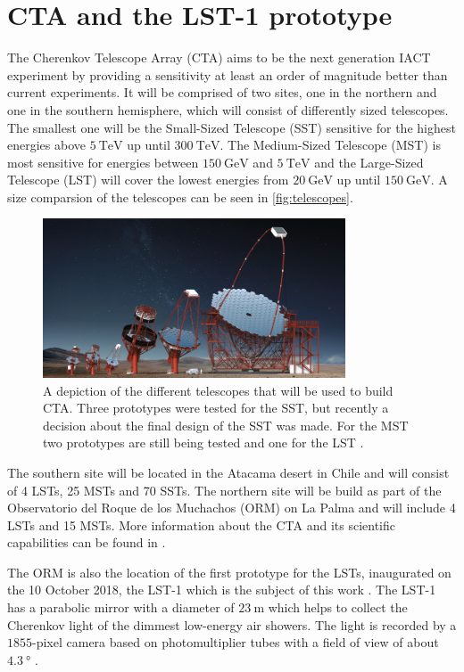 \section{CTA and the LST-1 prototype}
The Cherenkov Telescope Array (CTA) aims to be the next generation IACT experiment by providing a sensitivity at least an order of magnitude better than current experiments.
It will be comprised of two sites, one in the northern and one in the southern hemisphere, which will consist of differently sized telescopes. 
The smallest one will be the Small-Sized Telescope (SST) sensitive for the highest energies above $\SI{5}{\tera\electronvolt}$ up until $\SI{300}{\tera\electronvolt}$.
The Medium-Sized Telescope (MST) is most sensitive for energies between $\SI{150}{\giga\electronvolt}$ and $\SI{5}{\tera\electronvolt}$ and the 
Large-Sized Telescope (LST) will cover the lowest energies from $\SI{20}{\giga\electronvolt}$ up until $\SI{150}{\giga\electronvolt}$.
A size comparsion of the telescopes can be seen in \autoref{fig:telescopes}.
\begin{figure}
    \centering
    \includegraphics[width=0.8\textwidth]{images/CTA_telescopes.png}
    \caption{A depiction of the different telescopes that will be used to build CTA. 
        Three prototypes were tested for the SST, but recently a decision about the final design of the SST was made.
        For the MST two prototypes are still being tested and one for the LST \cite{cta-website}.
    }
    \label{fig:telescopes}
\end{figure}

The southern site will be located in the Atacama desert in Chile and will consist of \num{4} LSTs, \num{25} MSTs and \num{70} SSTs.
The northern site will be build as part of the Observatorio del Roque de los Muchachos (ORM) on La Palma and will include \num{4} LSTs and \num{15} MSTs.
More information about the CTA and its scientific capabilities can be found in \cite{science_with_cta}.

The ORM is also the location of the first prototype for the LSTs, inaugurated on the 10 October 2018, the LST-1 which is the subject of this work \cite{lst_inauguration}.
The LST-1 has a parabolic mirror with a diameter of $\SI{23}{\meter}$ which helps to collect the Cherenkov light of the dimmest low-energy air showers.
The light is recorded by a $\num{1855}$-pixel camera based on photomultiplier tubes with a field of view of about $\SI{4.3}{\degree}$ \cite{cta-website}.



